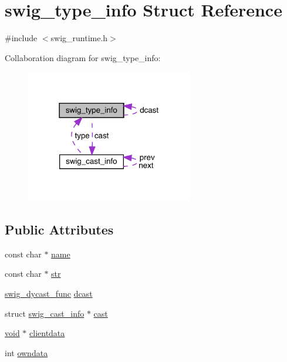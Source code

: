 \hypertarget{structswig__type__info}{}\section{swig\+\_\+type\+\_\+info Struct Reference}
\label{structswig__type__info}


{\ttfamily \#include $<$swig\+\_\+runtime.\+h$>$}



Collaboration diagram for swig\+\_\+type\+\_\+info\+:\nopagebreak
\begin{figure}[H]
\begin{center}
\leavevmode
\includegraphics[width=207pt]{structswig__type__info__coll__graph}
\end{center}
\end{figure}
\subsection*{Public Attributes}
\begin{DoxyCompactItemize}
\item 
const char $\ast$ \mbox{\hyperlink{structswig__type__info_a90a9c6a25aa3e923978005ecbe23ad60}{name}}
\item 
const char $\ast$ \mbox{\hyperlink{structswig__type__info_abbe7cc58a083feb4329b748643324064}{str}}
\item 
\mbox{\hyperlink{swig__runtime_8h_aee981c41d733723d60337a77630106af}{swig\+\_\+dycast\+\_\+func}} \mbox{\hyperlink{structswig__type__info_a07df4bedf85be77b23756b531b60e0dd}{dcast}}
\item 
struct \mbox{\hyperlink{structswig__cast__info}{swig\+\_\+cast\+\_\+info}} $\ast$ \mbox{\hyperlink{structswig__type__info_a3ee3f7ef20e965b6c798d79723a96f9b}{cast}}
\item 
\mbox{\hyperlink{_thread_8h_af1e856da2e658414cb2456cb6f7ebc66}{void}} $\ast$ \mbox{\hyperlink{structswig__type__info_a19bdd65dceb89cd54befd3ded06558b7}{clientdata}}
\item 
int \mbox{\hyperlink{structswig__type__info_a93c25d5903cbfcb82208eea7227c32bd}{owndata}}
\end{DoxyCompactItemize}


